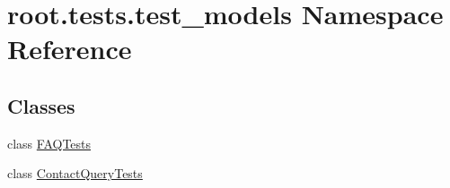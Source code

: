 \hypertarget{namespaceroot_1_1tests_1_1test__models}{\section{root.\-tests.\-test\-\_\-models Namespace Reference}
\label{namespaceroot_1_1tests_1_1test__models}
}
\subsection*{Classes}
\begin{DoxyCompactItemize}
\item 
class \hyperlink{classroot_1_1tests_1_1test__models_1_1_f_a_q_tests}{F\-A\-Q\-Tests}
\item 
class \hyperlink{classroot_1_1tests_1_1test__models_1_1_contact_query_tests}{Contact\-Query\-Tests}
\end{DoxyCompactItemize}

